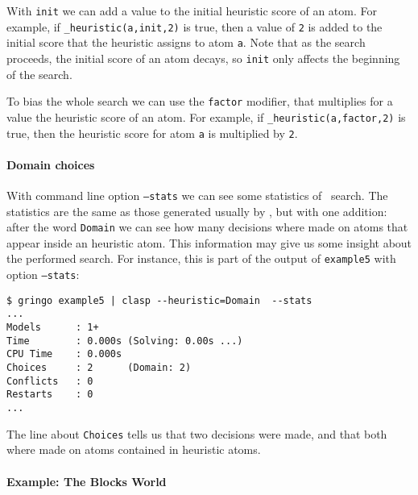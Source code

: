With \texttt{init} we can add a value to the initial heuristic score of an atom. 
For example, if \texttt{\_heuristic(a,init,2)} is true, then a value of \texttt{2} is added to  
the initial score that the heuristic assigns to atom \texttt{a}. 
Note that as the search proceeds, the initial score of an atom decays, so \texttt{init} only affects the beginning of the search. 

To bias the whole search we can use the \texttt{factor} modifier,  
that multiplies for a value the heuristic score of an atom. 
For example, if \texttt{\_heuristic(a,factor,2)} is true, then the heuristic score for atom \texttt{a}  is multiplied by \texttt{2}. 

\paragraph{Domain choices}

With command line option \texttt{--stats} we can see some statistics of \clasp\ search. 
The statistics are the same as those generated usually by \clasp, but with one addition:  
after the word \texttt{Domain} we can see how many decisions where made on atoms that appear  inside an heuristic atom. 
This information may give us some insight about the performed search. 
For instance, this is part of the output of \texttt{example5} with option \texttt{--stats}: 
\begin{verbatim}
$ gringo example5 | clasp --heuristic=Domain  --stats                                                                       
...
Models      : 1+    
Time        : 0.000s (Solving: 0.00s ...)
CPU Time    : 0.000s
Choices     : 2      (Domain: 2)
Conflicts   : 0
Restarts    : 0     
...
\end{verbatim}

 The line about \texttt{Choices} tells us that  two decisions were made, and that both where made on atoms contained in heuristic atoms. 


\paragraph{Example: The Blocks World}

